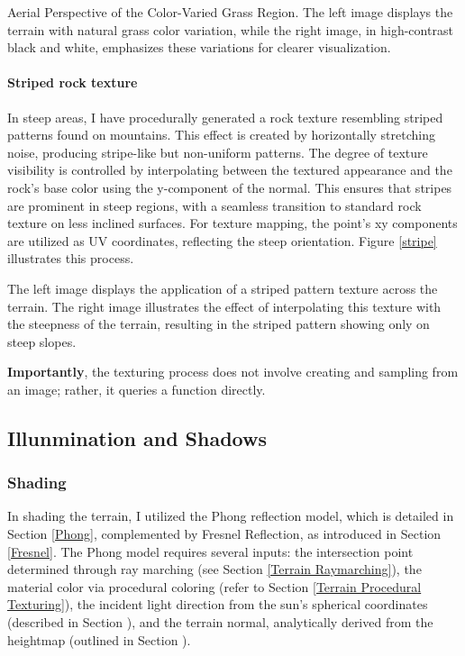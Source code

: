{Aerial Perspective of the Color-Varied Grass Region. The left image displays the terrain with natural grass color variation, while the right image, in high-contrast black and white, emphasizes these variations for clearer visualization.}

\paragraph{Striped rock texture}
In steep areas, I have procedurally generated a rock texture resembling striped patterns found on mountains. This effect is created by horizontally stretching noise, producing stripe-like but non-uniform patterns. The degree of texture visibility is controlled by interpolating between the textured appearance and the rock's base color using the y-component of the normal. This ensures that stripes are prominent in steep regions, with a seamless transition to standard rock texture on less inclined surfaces. For texture mapping, the point's xy components are utilized as UV coordinates, reflecting the steep orientation. Figure \ref{stripe} illustrates this process.

{The left image displays the application of a striped pattern texture across the terrain. The right image illustrates the effect of interpolating this texture with the steepness of the terrain, resulting in the striped pattern showing only on steep slopes.}

\textbf{Importantly}, the texturing process does not involve creating and sampling from an image; rather, it queries a function directly.


\subsection{Illunmination and Shadows}

\subsubsection{Shading}

In shading the terrain, I utilized the Phong reflection model, which is detailed in Section \ref{Phong}, complemented by Fresnel Reflection, as introduced in Section \ref{Fresnel}. The Phong model requires several inputs: the intersection point determined through ray marching (see Section \ref{Terrain Raymarching}), the material color via procedural coloring (refer to Section \ref{Terrain Procedural Texturing}), the incident light direction from the sun's spherical coordinates (described in Section ), and the terrain normal, analytically derived from the heightmap (outlined in Section ).

